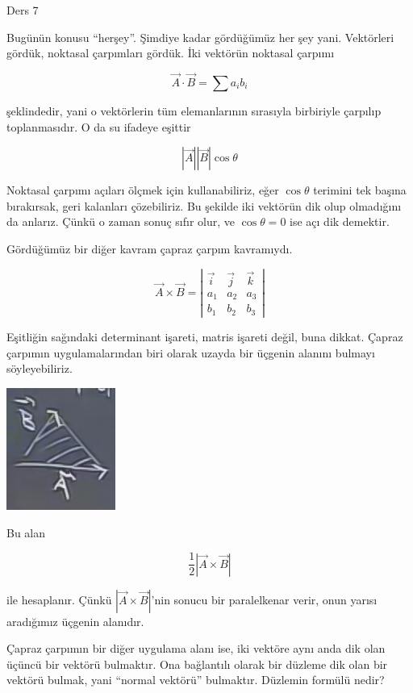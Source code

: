 \documentclass[12pt,fleqn]{article}\usepackage{../../common}
\begin{document}
Ders 7

Bugünün konusu ``herşey''. Şimdiye kadar gördüğümüz her şey
yani. Vektörleri gördük, noktasal çarpımları gördük. İki
vektörün noktasal çarpımı

$$ \vec{A} \cdot \vec{B} = \sum a_ib_i$$

şeklindedir, yani o vektörlerin tüm elemanlarının sırasıyla birbiriyle çarpılıp
toplanmasıdır. O da su ifadeye eşittir

$$ |\vec{A}||\vec{B}| \cos \theta $$

Noktasal çarpımı açıları ölçmek için kullanabiliriz, eğer $\cos \theta$
terimini tek başına bırakırsak, geri kalanları çözebiliriz. Bu şekilde iki
vektörün dik olup olmadığını da anlarız. Çünkü o zaman sonuç sıfır olur, ve
$\cos \theta = 0$ ise açı dik demektir. 

Gördüğümüz bir diğer kavram çapraz çarpım kavramıydı. 

$$ \vec{A} \times \vec{B} = 
\left|\begin{array}{rrr}
\vec{i} & \vec{j} & \vec{k}  \\
a_1 & a_2 & a_3 \\
b_1 & b_2 & b_3 
\end{array}\right|
$$

Eşitliğin sağındaki determinant işareti, matris işareti değil, buna
dikkat. Çapraz çarpımın uygulamalarından biri olarak uzayda bir üçgenin alanını 
bulmayı söyleyebiliriz.

\begin{center}


\includegraphics[height=4cm]{7_1.png}


\end{center}
Bu alan

$$ \frac{1}{2}|\vec{A} \times \vec{B}| $$

ile hesaplanır. Çünkü $|\vec{A} \times \vec{B}|$'nin sonucu bir paralelkenar 
verir, onun yarısı 
aradığımız üçgenin alanıdır.

Çapraz çarpımın bir diğer uygulama alanı ise, iki vektöre aynı anda dik olan
üçüncü bir vektörü bulmaktır. Ona bağlantılı olarak bir düzleme dik
olan bir vektörü bulmak, yani ``normal vektörü'' bulmaktır. Düzlemin formülü
nedir? 
\end{document}
